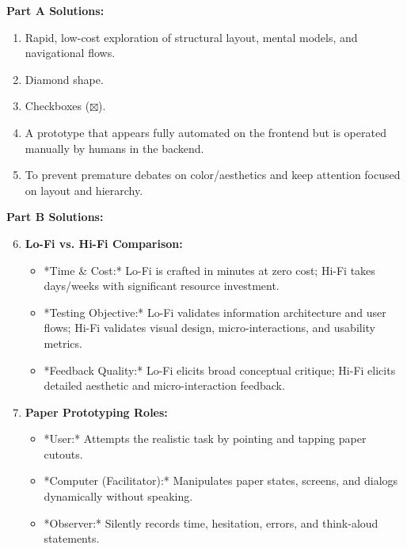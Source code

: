 \begin{solutionbox}
\textbf{Part A Solutions:}
\begin{enumerate}[leftmargin=1.2em, itemsep=2pt]
    \item Rapid, low-cost exploration of structural layout, mental models, and navigational flows.
    \item Diamond shape.
    \item Checkboxes ($\boxtimes$).
    \item A prototype that appears fully automated on the frontend but is operated manually by humans in the backend.
    \item To prevent premature debates on color/aesthetics and keep attention focused on layout and hierarchy.
\end{enumerate}

\textbf{Part B Solutions:}
\begin{enumerate}[leftmargin=1.2em, itemsep=3pt]
    \setcounter{enumi}{5}
    \item \textbf{Lo-Fi vs. Hi-Fi Comparison:}
    \begin{itemize}
        \item *Time \& Cost:* Lo-Fi is crafted in minutes at zero cost; Hi-Fi takes days/weeks with significant resource investment.
        \item *Testing Objective:* Lo-Fi validates information architecture and user flows; Hi-Fi validates visual design, micro-interactions, and usability metrics.
        \item *Feedback Quality:* Lo-Fi elicits broad conceptual critique; Hi-Fi elicits detailed aesthetic and micro-interaction feedback.
    \end{itemize}
    \item \textbf{Paper Prototyping Roles:}
    \begin{itemize}
        \item *User:* Attempts the realistic task by pointing and tapping paper cutouts.
        \item *Computer (Facilitator):* Manipulates paper states, screens, and dialogs dynamically without speaking.
        \item *Observer:* Silently records time, hesitation, errors, and think-aloud statements.
    \end{itemize}
\end{enumerate}


\end{solutionbox}
